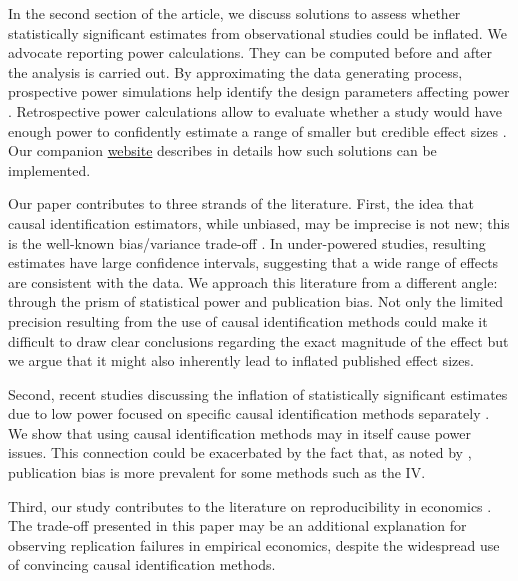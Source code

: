 \documentclass[12pt]{article}
\begin{document}
In the second section of the article, we discuss solutions to assess whether statistically significant estimates from observational studies could be inflated. We advocate reporting power calculations. They can be computed before and after the analysis is carried out. By approximating the data generating process, prospective power simulations help identify the design parameters affecting power \citep{gelman_regression_2020, black_simulated_2021}. Retrospective power calculations allow to evaluate whether a study would have enough power to confidently estimate a range of smaller but credible effect sizes \citep{gelman_beyond_2014, stommes_reliability_2021}. Our companion \href{https://vincentbagilet.github.io/causal_inflation/}{website} describes in details how such solutions can be implemented. 

Our paper contributes to three strands of the literature. First, the idea that causal identification estimators, while unbiased, may be imprecise is not new; this is the well-known bias/variance trade-off \citep{imbens_optimal_2012, deaton_understanding_2018, hernan_causal_2020, ravallion_should_2020}. In under-powered studies, resulting estimates have large confidence intervals, suggesting that a wide range of effects are consistent with the data. We approach this literature from a different angle: through the prism of statistical power and publication bias. Not only the limited precision resulting from the use of causal identification methods could make it difficult to draw clear conclusions regarding the exact magnitude of the effect but we argue that it might also inherently lead to inflated published effect sizes.

Second, recent studies discussing the inflation of statistically significant estimates due to low power focused on specific causal identification methods separately \citep{schell_evaluating_2018, black_simulated_2021, stommes_reliability_2021, young_leverage_2021}. We show that using causal identification methods may in itself cause power issues. This connection could be exacerbated by the fact that, as noted by \cite{brodeur_methods_2020}, publication bias is more prevalent for some methods such as the IV. 

Third, our study contributes to the literature on reproducibility in economics \citep{camerer_evaluating_2016, ioannidis_power_2017, christensen_transparency_2018, kasy_forking_2021}. The trade-off presented in this paper may be an additional explanation for observing replication failures in empirical economics, despite the widespread use of convincing causal identification methods.
\end{document}
